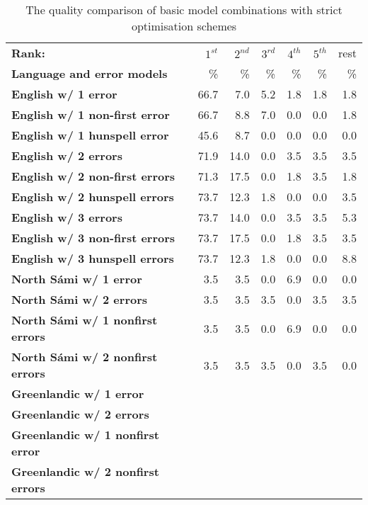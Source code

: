 \documentclass[a4paper,12pt]{article}
\begin{document}
\begin{table}
    \centering
    \begin{tabular}{|l|r|r|r|r|r|r|}
        \hline
        \bf Rank: & $1^{st}$ & $2^{nd}$ & $3^{rd}$ & $4^{th}$ & $5^{th}$ & rest \\
        \bf Language and error models &  \% & \% & \% & \% & \% & \% \\
        \hline
        \bf English w/ 1 error     & 66.7 & 7.0  & 5.2 & 1.8 & 1.8 & 1.8 \\
 \bf English w/ 1 non-first error  & 66.7 & 8.8  & 7.0 & 0.0 & 0.0 & 1.8 \\
 \bf English w/ 1 hunspell error   & 45.6 & 8.7  & 0.0 & 0.0 & 0.0 & 0.0 \\
     \bf English w/ 2 errors       & 71.9 & 14.0 & 0.0 & 3.5 & 3.5 & 3.5 \\
 \bf English w/ 2 non-first errors & 71.3 & 17.5 & 0.0 & 1.8 & 3.5 & 1.8 \\
 \bf English w/ 2 hunspell errors  & 73.7 & 12.3 & 1.8 & 0.0 & 0.0 & 3.5 \\
   \bf English w/ 3 errors         & 73.7 & 14.0 & 0.0 & 3.5 & 3.5 & 5.3 \\
 \bf English w/ 3 non-first errors & 73.7 & 17.5 & 0.0 & 1.8 & 3.5 & 3.5 \\
 \bf English w/ 3 hunspell errors  & 73.7 & 12.3 & 1.8 & 0.0 & 0.0 & 8.8 \\
        \hline
        \bf North Sámi w/ 1 error & 3.5 & 3.5 & 0.0 & 6.9 & 0.0 & 0.0 \\
        \bf North Sámi w/ 2 errors & 3.5 & 3.5 & 3.5 & 0.0 & 3.5 & 3.5 \\
        \bf North Sámi w/ 1 nonfirst errors & 3.5 & 3.5 & 0.0 & 6.9 & 0.0 & 0.0\\
        \bf North Sámi w/ 2 nonfirst errors & 3.5 & 3.5 & 3.5 & 0.0 & 3.5 & 0.0\\
        \hline
        \bf Greenlandic w/ 1 error & & & & & & \\
       \bf Greenlandic w/ 2 errors & & & & & & \\
        \bf Greenlandic w/ 1 nonfirst error & & & & & & \\
       \bf Greenlandic w/ 2 nonfirst errors & & & & & & \\
        \hline
    \end{tabular}
    \caption{The quality comparison of basic model combinations with strict
    optimisation schemes\label{table:optimisation-quality}}
\end{table}
\end{document}
